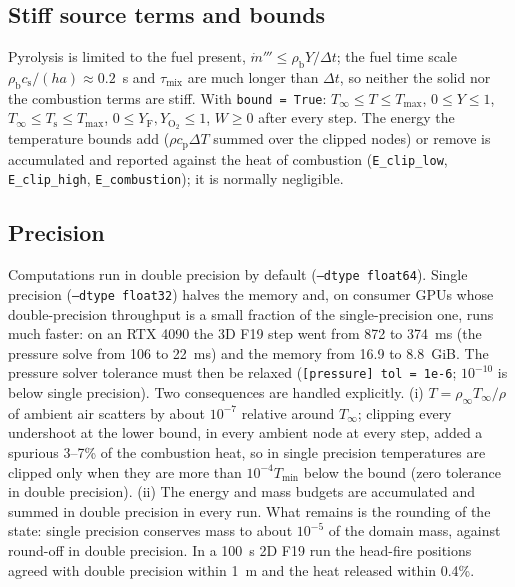 \documentclass[11pt,a4paper]{article}
\newcommand{\code}[1]{\texttt{#1}}
\newcommand{\Yf}{Y_\text{F}}
\newcommand{\YO}{Y_{\mathrm{O_2}}}
\begin{document}
\subsection{Stiff source terms and bounds}
Pyrolysis is limited to the fuel present, $\dot m'''\le\rho_\text{b}Y/\Delta t$; the fuel time scale
$\rho_\text{b}c_\text{s}/(ha)\approx0.2$~s and $\tau_\text{mix}$ are much longer than $\Delta t$, so neither the solid
nor the combustion terms are stiff. With \code{bound = True}: $T_\infty\le T\le T_\text{max}$,
$0\le Y\le1$, $T_\infty\le T_\text{s}\le T_\text{max}$, $0\le\Yf,\YO\le1$, $W\ge0$ after every step. The energy the
temperature bounds add ($\rho c_\text{p}\Delta T$ summed over the clipped nodes) or remove is accumulated and
reported against the heat of combustion (\code{E\_clip\_low}, \code{E\_clip\_high},
\code{E\_combustion}); it is normally negligible.

\subsection{Precision}
Computations run in double precision by default (\code{--dtype float64}). Single precision
(\code{--dtype float32}) halves the memory and, on consumer GPUs whose double-precision throughput is a
small fraction of the single-precision one, runs much faster: on an RTX 4090 the 3D F19 step went from
872 to 374~ms (the pressure solve from 106 to 22~ms) and the memory from 16.9 to 8.8~GiB. The pressure
solver tolerance must then be relaxed (\code{[pressure] tol = 1e-6}; $10^{-10}$ is below single precision).
Two consequences are handled explicitly. (i) $T=\rho_\infty T_\infty/\rho$ of ambient air scatters by about
$10^{-7}$ relative around $T_\infty$; clipping every undershoot at the lower bound, in every ambient node at
every step, added a spurious 3--7\% of the combustion heat, so in single precision temperatures are
clipped only when they are more than $10^{-4}T_\text{min}$ below the bound (zero tolerance in double
precision). (ii) The energy and mass budgets are accumulated and summed in double precision in every
run. What remains is the rounding of the state: single precision conserves mass to about $10^{-5}$ of the
domain mass, against round-off in double precision. In a 100~s 2D F19 run the head-fire positions agreed
with double precision within 1~m and the heat released within 0.4\%.
\end{document}
